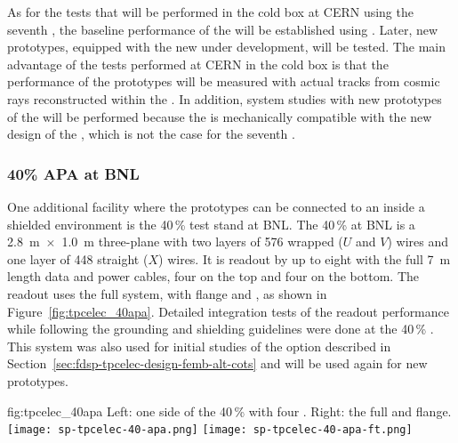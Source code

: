 As for the tests that will be performed in the cold box at CERN using the seventh
 , the baseline performance of the  
will be established using  . Later, new prototypes, equipped
with the new  under development, will be tested. The main advantage
of the tests performed at CERN in the cold box is that the performance of the
 prototypes will be measured with actual tracks from cosmic rays 
reconstructed within the . In addition, system studies with new 
prototypes of the  will be performed because the  is
mechanically compatible with the new design of the , which is not
the case for the seventh  .


\subsubsection{40\% APA at BNL}
\label{sec:fdsp-tpcelec-qa-facilities-fortypercent}

One additional facility where the  prototypes can be connected to
an  inside a shielded environment is the \num{40}\,\%  
test stand at BNL. The \num{40}\,\%  at BNL is a \SI{2.8}{m}~$\times$~\SI{1.0}{m} 
three-plane  with two layers of \num{576} wrapped ($U$ and $V$) wires 
and one layer of \num{448} straight ($X$) wires. It is readout by up to eight 
 with the full \SI{7}{m}  length data and  power 
cables, four on the top and four on the bottom. The readout uses the full  
system, with  flange and , as shown in Figure~\ref{fig:tpcelec_40apa}. 
Detailed integration tests of the   readout performance while 
following the  grounding and shielding guidelines were done at the \num{40}\,\% 
. This system was also used for initial studies of the  
option described in Section~\ref{sec:fdsp-tpcelec-design-femb-alt-cots} and will
be used again for new  prototypes.

\begin{dunefigure}
{fig:tpcelec_40apa}
{Left: one side of the \num{40}\,\%  with four .  Right: the full  \fdth and flange.}
\texttt{[image: sp-tpcelec-40-apa.png]}
\hspace{3mm}
\texttt{[image: sp-tpcelec-40-apa-ft.png]}
\end{dunefigure}

